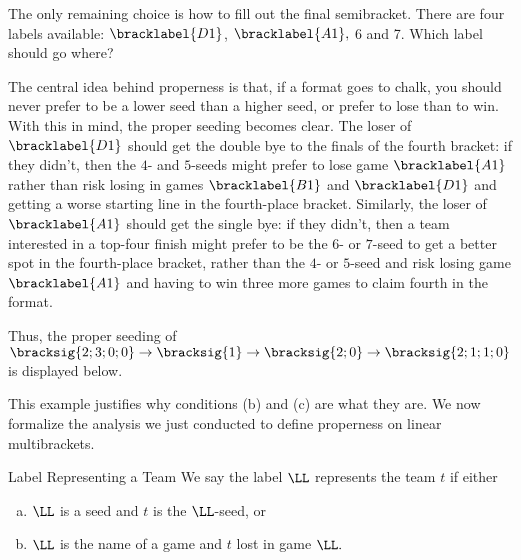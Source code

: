 {    

    The only remaining choice is how to fill out the final semibracket. There are four labels available: $\bracklabel{D1}$, $\bracklabel{A1},$ 6 and 7. Which label should go where?

    The central idea behind properness is that, if a format goes to chalk, you should never prefer to be a lower seed than a higher seed, or prefer to lose than to win. With this in mind, the proper seeding becomes clear. The loser of $\bracklabel{D1}$ should get the double bye to the finals of the fourth bracket: if they didn't, then the $4$- and $5$-seeds might prefer to lose game $\bracklabel{A1}$ rather than risk losing in games $\bracklabel{B1}$ and $\bracklabel{D1}$ and getting a worse starting line in the fourth-place bracket. Similarly, the loser of $\bracklabel{A1}$ should get the single bye: if they didn't, then a team interested in a top-four finish might prefer to be the $6$- or $7$-seed to get a better spot in the fourth-place bracket, rather than the $4$- or $5$-seed and risk losing game $\bracklabel{A1}$ and having to win three more games to claim fourth in the format.

    Thus, the proper seeding of $\bracksig{2;3;0;0} \to \bracksig{1} \to \bracksig{2;0} \to \bracksig{2;1;1;0}$ is displayed below.


    This example justifies why conditions (b) and (c) are what they are. We now formalize the analysis we just conducted to define properness on linear multibrackets.

    \begin{definition}{Label Representing a Team}{}
        We say the label $\LL$ represents the team $t$ if either
        \begin{enumerate}[(a)]
            \item $\LL$ is a seed and $t$ is the $\LL$-seed, or
            \item $\LL$ is the name of a game and $t$ lost in game $\LL.$
        \end{enumerate}
    \end{definition}

}
